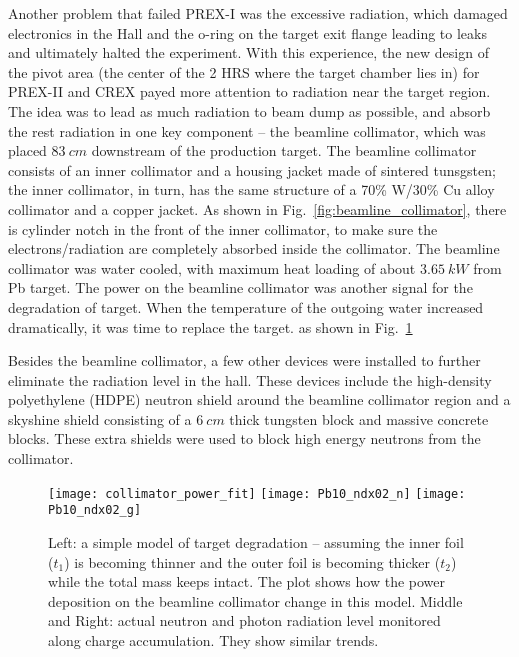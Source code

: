 Another problem that failed PREX-I was the excessive radiation, which damaged 
electronics in the Hall and the o-ring on the target exit flange leading to
leaks and ultimately halted the experiment.
With this experience, the new design of the pivot area (the center of the 2 HRS 
where the target chamber lies in) for PREX-II and CREX payed more attention
to radiation near the target region. The idea was to lead as much radiation to
beam dump as possible, and absorb the rest radiation in one key component --
the beamline collimator, which was placed $83\ cm$ downstream of the production 
target. The beamline collimator consists of an inner collimator and a housing
jacket made of sintered tunsgsten; the inner collimator, in turn, has the same 
structure of a 70\% W/30\% Cu alloy collimator and a copper jacket. As shown
in Fig.~\ref{fig:beamline_collimator}, there is cylinder notch in the front of
the inner collimator, to make sure the electrons/radiation are completely 
absorbed inside the collimator. The beamline collimator was water cooled, with
maximum heat loading of about $3.65\ kW$ from Pb target. The power on the beamline
collimator was another signal for the degradation of target. When the temperature 
of the outgoing water increased dramatically, it was time to replace the target.
as shown in Fig.~\ref{fig:collimator_see_target_degradation}

Besides the beamline collimator, a few other devices were installed 
to further eliminate the radiation level in the hall. These devices include the 
high-density polyethylene (HDPE) neutron shield around the beamline collimator
region and a skyshine shield consisting of a $6\ cm$ thick tungsten block and
massive concrete blocks. These extra shields were used to block high energy
neutrons from the collimator.

\begin{figure}[h!]
    \texttt{[image: collimator\_power\_fit]}
    \texttt{[image: Pb10\_ndx02\_n]}
    \texttt{[image: Pb10\_ndx02\_g]}
    \caption{Left: a simple model of target degradation -- assuming the inner 
    foil ($t_1$) is becoming thinner and the outer foil is becoming thicker ($t_2$) 
    while the total mass keeps intact. The plot shows how the power deposition 
    on the beamline collimator change in this model. Middle and Right: actual
    neutron and photon radiation level monitored along charge accumulation. They
    show similar trends.}
    \label{fig:collimator_see_target_degradation}
\end{figure}

